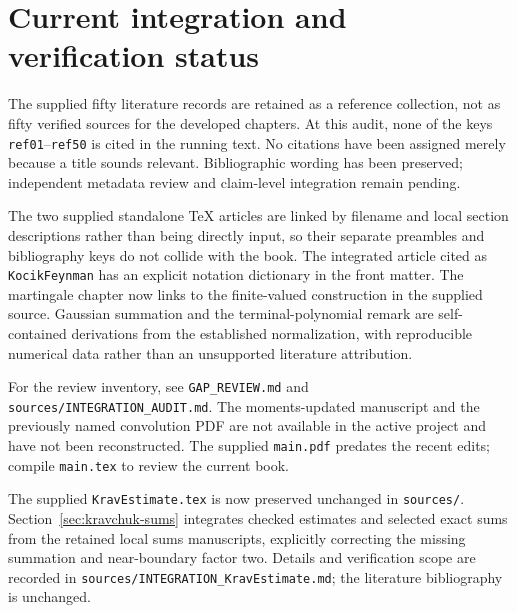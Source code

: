 \section*{Current integration and verification status}
The supplied fifty literature records are retained as a reference collection, not as fifty verified sources for the developed chapters. At this audit, none of the keys \texttt{ref01}--\texttt{ref50} is cited in the running text. No citations have been assigned merely because a title sounds relevant. Bibliographic wording has been preserved; independent metadata review and claim-level integration remain pending.

The two supplied standalone TeX articles are linked by filename and local section descriptions rather than being directly input, so their separate preambles and bibliography keys do not collide with the book. The integrated article cited as \texttt{KocikFeynman} has an explicit notation dictionary in the front matter. The martingale chapter now links to the finite-valued construction in the supplied source. Gaussian summation and the terminal-polynomial remark are self-contained derivations from the established normalization, with reproducible numerical data rather than an unsupported literature attribution.

For the review inventory, see \texttt{GAP\_REVIEW.md} and \texttt{sources/INTEGRATION\_AUDIT.md}. The moments-updated manuscript and the previously named convolution PDF are not available in the active project and have not been reconstructed. The supplied \texttt{main.pdf} predates the recent edits; compile \texttt{main.tex} to review the current book.

\par The supplied \texttt{KravEstimate.tex} is now preserved unchanged in \texttt{sources/}. Section~\ref{sec:kravchuk-sums} integrates checked estimates and selected exact sums from the retained local sums manuscripts, explicitly correcting the missing summation and near-boundary factor two. Details and verification scope are recorded in \texttt{sources/INTEGRATION\_KravEstimate.md}; the literature bibliography is unchanged.
